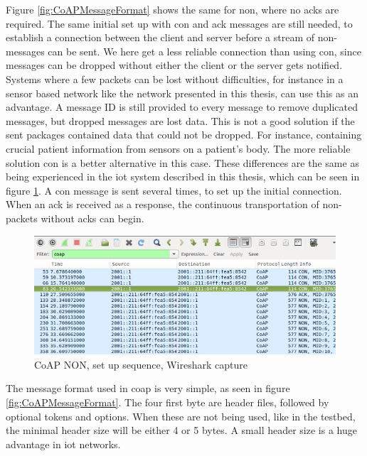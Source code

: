 \noindent Figure \ref{fig:CoAPMessageFormat} shows the same for \gls{non}, where no \glspl{ack} are required. The same initial set up with \gls{con} and \gls{ack} messages are still needed, to establish a connection between the client and server before a stream of \gls{non}-messages can be sent. We here get a less reliable connection than using \gls{con}, since messages can be dropped without either the client or the server gets notified. Systems where a few packets can be lost without difficulties, for instance in a sensor based network like the network presented in this thesis, can use this as an advantage. A message ID is still provided to every message to remove duplicated messages, but dropped messages are lost data.  This is not a good solution if the sent packages contained data that could not be dropped. For instance, containing crucial patient information from sensors on a patient's body. The more reliable solution \gls{con} is a better alternative in this case. These differences are the same as being experienced in the \gls{iot} system described in this thesis, which can be seen in figure \ref{fig:CoAPNONwiresharkSetUp}. A \gls{con} message is sent several times, to set up the initial connection. When an \gls{ack} is received as a response, the continuous transportation of \gls{non}-packets without \glspl{ack} can begin. %

\begin{figure}[ht]
    \centering
    \includegraphics[width=1.0\textwidth]{coapCONwiresharksetUpSequence.png}    
    \caption{CoAP NON, set up sequence, Wireshark capture}
    \label{fig:CoAPNONwiresharkSetUp}
\end{figure}


\noindent The message format used in \gls{coap} is very simple, as seen in figure \ref{fig:CoAPMessageFormat}. The four first byte are header files, followed by optional tokens and options. When these are not being used, like in the testbed, the minimal header size will be either 4 or 5 bytes. A small header size is a huge advantage in \gls{iot} networks.

